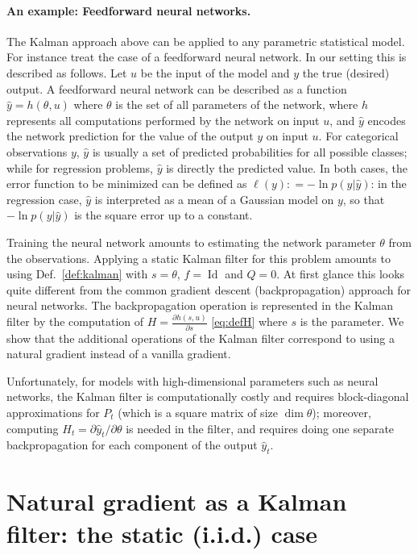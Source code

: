 \documentclass[11pt,a4paper]{article}
\newcommand{\deq}{\mathrel{\mathop{:}}=}
\DeclareMathOperator{\Id}{Id}
\newcommand{\1}{\mathbbm{1}}
\theoremstyle{yannthm}
\theoremstyle{yannthm2}
\numberwithin{equation}{section}
\begin{document}
\paragraph*{An example: Feedforward neural networks.} The Kalman approach
above can be applied to any parametric statistical model. For instance
\cite{singhalwu1988} treat the case of a feedforward neural network. In
our setting this is described as follows. Let $u$ be the input of the
model and $y$ the true (desired) output. A feedforward neural network can be
described as a function $\hat y=h(\theta,u)$ where $\theta$ is the set of
all parameters of the network, where $h$ represents all computations
performed by the network on input $u$, and $\hat y$ encodes the network
prediction for the value of the output $y$ on input $u$. For categorical
observations $y$, $\hat y$ is usually a set of predicted probabilities
for all possible classes; while for regression problems, $\hat y$ is
directly the predicted value. In both cases, the error function to be
minimized can be defined as $\ell(y)\deq -\ln p(y|\hat y)$: in the
regression case, $\hat y$ is interpreted as a mean of a Gaussian model on
$y$, so that $-\ln p(y|\hat y)$ is the square error up to a constant.

Training the neural network amounts to estimating the network parameter
$\theta$ from the observations. Applying a static Kalman filter for this
problem \cite{singhalwu1988} amounts to using Def.~\ref{def:kalman} with
$s=\theta$, $f=\Id$ and $Q=0$. At first glance this looks quite different
from the common gradient descent (backpropagation) approach for neural
networks. The
backpropagation operation is represented in the Kalman filter by the
computation of $H=\frac{\partial h(s,u)}{\partial s}$
\eqref{eq:defH} where $s$ is the parameter. We show that the additional
operations of the Kalman filter correspond to using a natural gradient
instead of a vanilla gradient.

Unfortunately, for models with high-dimensional parameters such as neural
networks, the Kalman filter is computationally costly and requires
block-diagonal approximations for $P_t$ (which is a square matrix of size
$\dim \theta$); moreover, computing $H_t=\partial \hat y_t/\partial
\theta$ is needed in the filter, and requires doing one separate
backpropagation for each component of the output $\hat y_t$.


\section{Natural gradient as a Kalman filter: the static (i.i.d.) case}
\label{sec:static}
\end{document}
